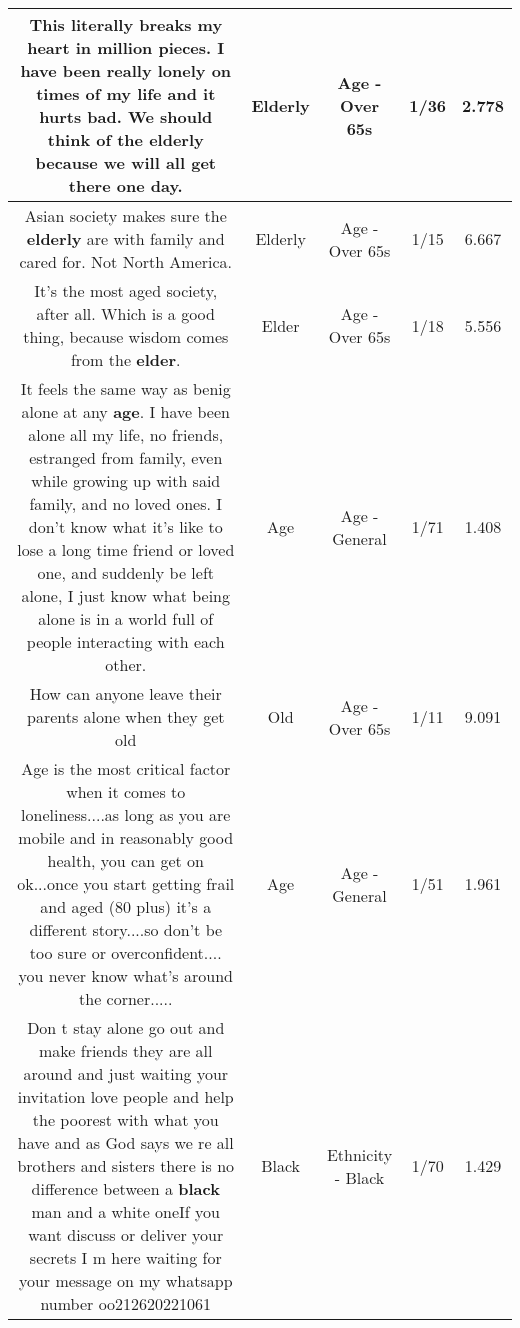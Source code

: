 \documentclass[11pt]{article}
\newlength\mylength
\begin{document}
\begin{center}
\begin{longtable}{|C{.65\mylength}|C{.30\mylength}|C{.12\mylength}|C{.12\mylength}|C{.12\mylength}|}
  \small This literally breaks my heart in million pieces. I have been really lonely on times of my life and it hurts bad. We should think of the \textbf{elderly} because we will all get there one day.\normalsize   & Elderly & Age - Over 65s & 1/36 & 2.778 \\  \hline
  \small Asian society makes sure the \textbf{elderly} are with family and cared for.  Not North America.\normalsize   & Elderly & Age - Over 65s & 1/15 & 6.667 \\  \hline
  \small It's the most aged society, after all. Which is a good thing, because wisdom comes from the \textbf{elder}.\normalsize   & Elder & Age - Over 65s & 1/18 & 5.556 \\  \hline
  \small It feels the same way as benig alone at any \textbf{age}. I have been alone all my life, no friends, estranged from family, even while growing up with said family, and no loved ones. I don't know what it's like to lose a long time friend or loved one, and suddenly be left alone, I just know what being alone is in a world full of people interacting with each other.\normalsize   & Age & Age - General & 1/71 & 1.408 \\  \hline
  \small How can anyone leave their parents alone when they get old\normalsize   & Old & Age - Over 65s & 1/11 & 9.091 \\  \hline
  \small Age is the most critical factor when it comes to loneliness....as long as you are mobile and in reasonably good health, you can get on ok...once you start getting frail and aged (80 plus) it's a different story....so don't be too sure or overconfident.... you never know what's around the corner.....\normalsize   & Age & Age - General & 1/51 & 1.961 \\  \hline
  \small Don t stay alone go out  and make friends they are all around  and just waiting your invitation love people and help the poorest with what you have and as God says  we re all brothers and sisters  there is no difference between a \textbf{black} man and a white oneIf you want discuss or deliver your secrets I m here waiting for your message on my whatsapp number oo212620221061\normalsize   & Black & Ethnicity - Black & 1/70 & 1.429 \\  \hline

\end{longtable}
\end{center}
\end{document}
